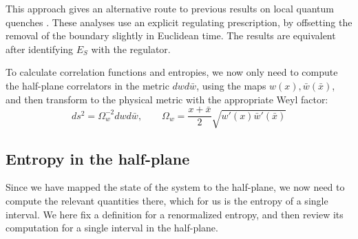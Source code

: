 \documentclass[12pt]{article}
\begin{document}
This approach gives an alternative route to previous results on local quantum quenches  \cite{Calabrese:2007mtj, Calabrese:2009qy, Asplund:2013zba}. These analyses use an explicit regulating prescription, by offsetting the removal of the boundary slightly in Euclidean time. The results are equivalent after identifying $E_S$ with the regulator.

To calculate correlation functions and entropies, we now only need to compute the half-plane correlators in the metric $dwd\bar{w}$, using the maps $w(x),\bar{w}(\bar{x})$, and then transform to the physical metric with the appropriate Weyl factor:
\begin{equation}\label{eq:Weyl}
	ds^2 = \Omega_w^{-2} dwd\bar{w},\qquad \Omega_w = \frac{x+\bar{x}}{2} \sqrt{w'(x)\bar{w}'(\bar{x})} %
\end{equation}


\subsection{Entropy in the half-plane}

Since we have mapped the state of the system to the half-plane, we now need to compute the relevant quantities there, which for us is the entropy of a single interval. We here fix a definition for a renormalized entropy, and then review its computation for a single interval in the half-plane.
\end{document}
